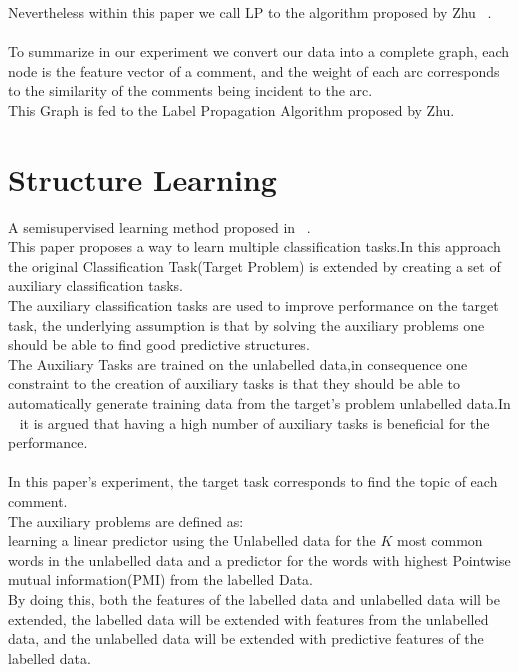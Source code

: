 \documentclass[4pt,a4paper,twocolumn]{article}
\begin{document}
Nevertheless within this paper we call LP to the algorithm proposed by Zhu ~\cite{Zhu:2005:SLG:1104523}.\\
\\
To summarize in our experiment we convert our data into a complete graph,
each node is the feature vector of a comment, and the weight of each arc
corresponds to the similarity of the comments being incident to the arc.\\
This Graph is  fed to the Label Propagation Algorithm proposed by Zhu.\\



 
\section{Structure Learning}
A semisupervised learning method proposed in ~\cite{Ando:2005:FLP:1046920.1194905}.\\
This paper proposes a way to learn multiple classification tasks.In this approach the original Classification Task(Target Problem) is extended by creating a set of auxiliary classification tasks.\\
The auxiliary classification tasks are used to improve performance on the target task,
the underlying assumption is that by solving the auxiliary problems one should be able to find good predictive structures.\\
The Auxiliary Tasks are trained on the unlabelled data,in consequence one constraint to the creation of auxiliary tasks is that they should be able to automatically generate training data from the target's problem unlabelled data.In ~\cite{Ando:2005:HSL:1219840.1219841} it is argued that having a high number of auxiliary tasks is beneficial for the performance.\\
\\
In this paper's experiment, the target task corresponds to find the topic of each comment.\\
The auxiliary problems are defined as:\\
learning a linear predictor using the Unlabelled data for the $K$ most common words in the unlabelled data and a predictor for the words with highest Pointwise mutual information(PMI) from the labelled Data.\\
By doing this, both the features of the labelled data and unlabelled data will be extended, the labelled data will be extended with features from the unlabelled data, and the unlabelled data will be extended with predictive features of the labelled data.\\
\end{document}
